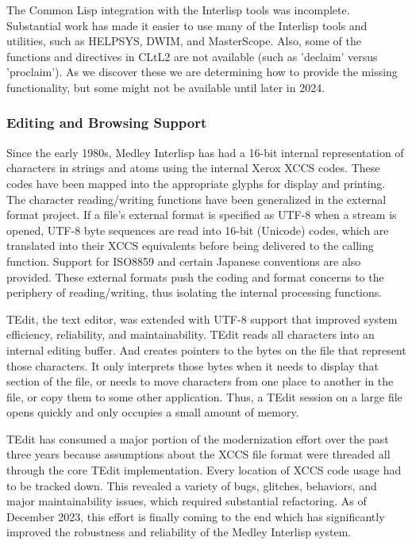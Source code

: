 \documentclass[sigconf]{acmart}
\begin{document}
The Common Lisp integration with the Interlisp tools was incomplete. Substantial work has made it easier to use many of the Interlisp tools and utilities, such as HELPSYS, DWIM, and MasterScope. Also, some of the functions and directives in CLtL2 are not available (such as 'declaim' versus 'proclaim'). As we discover these we are determining how to provide the missing functionality, but some might not be available until later in 2024.

\subsubsection{Editing and Browsing Support}

Since the early 1980s, Medley Interlisp has had a 16-bit internal representation of characters in strings and atoms using the internal Xerox XCCS codes\cite{Nuyens86}. These codes have been mapped into the appropriate glyphs for display and printing. The character reading/writing functions have been generalized in the external format project. If a file's external format is specified as UTF-8 when a stream is opened, UTF-8 byte sequences are read into 16-bit (Unicode) codes, which are translated into their XCCS equivalents before being delivered to the calling function. Support for ISO8859 and certain Japanese conventions are also provided. These external formats push the coding and format concerns to the periphery of reading/writing, thus isolating the internal processing functions\cite{Kaplan21}.

TEdit, the text editor, was extended with UTF-8 support that improved system efficiency, reliability, and maintainability\cite{Xerox86}. TEdit reads all characters into an internal editing buffer. And creates pointers to the bytes on the file that represent those characters. It only interprets those bytes when it needs to display that section of the file, or needs to move characters from one place to another in the file, or copy them to some other application. Thus, a TEdit session on a large file opens quickly and only occupies a small amount of memory.

TEdit has consumed a major portion of the modernization effort over the past three years because assumptions about the XCCS file format were threaded all through the core TEdit implementation. Every location of XCCS code usage had to be tracked down. This revealed a variety of bugs, glitches, behaviors, and major maintainability issues, which required substantial refactoring. As of December 2023, this effort is finally coming to the end which has significantly improved the robustness and reliability of the Medley Interlisp system.
\end{document}

